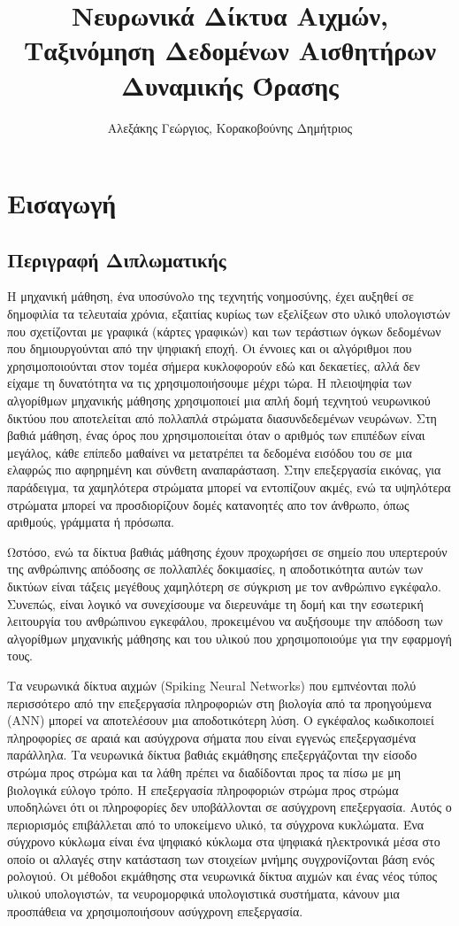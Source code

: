 \documentclass[12pt]{report}
\title{Νευρωνικά Δίκτυα Αιχμών, Ταξινόμηση Δεδομένων Αισθητήρων Δυναμικής Όρασης}
\author{Αλεξάκης Γεώργιος, Κορακοβούνης Δημήτριος}
\begin{document}
\maketitle
\frontmatter
{}
\tableofcontents{}
\chapter{Εισαγωγή}

\section{Περιγραφή Διπλωματικής}
Η μηχανική μάθηση, ένα υποσύνολο της τεχνητής νοημοσύνης, έχει αυξηθεί σε δημοφιλία τα τελευταία χρόνια, εξαιτίας κυρίως των εξελίξεων στο υλικό υπολογιστών που σχετίζονται με γραφικά (κάρτες γραφικών) και των τεράστιων όγκων δεδομένων που δημιουργούνται από την ψηφιακή εποχή. Οι έννοιες και οι αλγόριθμοι που χρησιμοποιούνται στον τομέα σήμερα κυκλοφορούν εδώ και δεκαετίες, αλλά δεν είχαμε τη δυνατότητα να τις χρησιμοποιήσουμε μέχρι τώρα. Η πλειοψηφία των αλγορίθμων μηχανικής μάθησης χρησιμοποιεί μια απλή δομή τεχνητού νευρωνικού δικτύου που αποτελείται από πολλαπλά στρώματα διασυνδεδεμένων νευρώνων. Στη βαθιά μάθηση, ένας όρος που χρησιμοποιείται όταν ο αριθμός των επιπέδων είναι μεγάλος, κάθε επίπεδο μαθαίνει να μετατρέπει τα δεδομένα εισόδου του σε μια ελαφρώς πιο αφηρημένη και σύνθετη αναπαράσταση. Στην επεξεργασία εικόνας, για παράδειγμα, τα χαμηλότερα στρώματα μπορεί να εντοπίζουν ακμές, ενώ τα υψηλότερα στρώματα μπορεί να προσδιορίζουν δομές κατανοητές απο τον άνθρωπο, όπως αριθμούς, γράμματα ή πρόσωπα.  

Ωστόσο, ενώ τα δίκτυα βαθιάς μάθησης έχουν προχωρήσει σε σημείο που υπερτερούν της ανθρώπινης απόδοσης σε πολλαπλές δοκιμασίες, η αποδοτικότητα αυτών των δικτύων είναι τάξεις μεγέθους χαμηλότερη σε σύγκριση με τον ανθρώπινο εγκέφαλο. Συνεπώς, είναι λογικό να συνεχίσουμε να διερευνάμε τη δομή και την εσωτερική λειτουργία του ανθρώπινου εγκεφάλου, προκειμένου να αυξήσουμε την απόδοση των αλγορίθμων μηχανικής μάθησης και του υλικού που χρησιμοποιούμε για την εφαρμογή τους.

Τα νευρωνικά δίκτυα αιχμών \textlatin{(Spiking Neural Networks)} που εμπνέονται πολύ περισσότερο από την επεξεργασία πληροφοριών στη βιολογία από τα προηγούμενα (ANN) μπορεί να αποτελέσουν μια αποδοτικότερη λύση. Ο εγκέφαλος κωδικοποιεί πληροφορίες σε αραιά και ασύγχρονα σήματα που είναι εγγενώς επεξεργασμένα παράλληλα. Τα νευρωνικά δίκτυα βαθιάς εκμάθησης επεξεργάζονται την είσοδο στρώμα προς στρώμα και τα λάθη πρέπει να διαδίδονται προς τα πίσω με μη βιολογικά εύλογο τρόπο. Η επεξεργασία πληροφοριών στρώμα προς στρώμα υποδηλώνει ότι οι πληροφορίες δεν υποβάλλονται σε ασύγχρονη επεξεργασία. Αυτός ο περιορισμός επιβάλλεται από το υποκείμενο υλικό, τα σύγχρονα κυκλώματα. Ένα σύγχρονο κύκλωμα είναι ένα ψηφιακό κύκλωμα στα ψηφιακά ηλεκτρονικά μέσα στο οποίο οι αλλαγές στην κατάσταση των στοιχείων μνήμης συγχρονίζονται βάση ενός ρολογιού. Οι μέθοδοι εκμάθησης στα  νευρωνικά δίκτυα αιχμών και ένας νέος τύπος υλικού υπολογιστών, τα νευρομορφικά υπολογιστικά συστήματα, κάνουν μια προσπάθεια να χρησιμοποιήσουν ασύγχρονη επεξεργασία.
\end{document}
